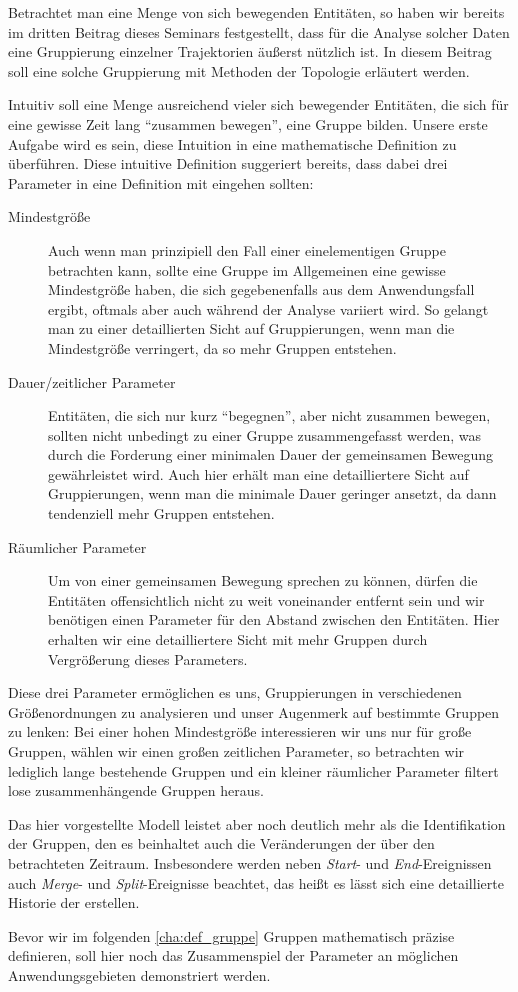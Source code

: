 Betrachtet man eine Menge von sich bewegenden Entitäten, so haben wir bereits im dritten Beitrag dieses Seminars festgestellt, dass für die Analyse solcher Daten eine Gruppierung einzelner Trajektorien äußerst nützlich ist.
In diesem Beitrag soll eine solche Gruppierung mit Methoden der Topologie erläutert werden.

Intuitiv soll eine Menge ausreichend vieler sich bewegender Entitäten, die sich für eine gewisse Zeit lang \enquote{zusammen bewegen}, eine Gruppe bilden.
Unsere erste Aufgabe wird es sein, diese Intuition in eine mathematische Definition zu überführen.
Diese intuitive Definition suggeriert bereits, dass dabei drei Parameter in eine Definition mit eingehen sollten:
\begin{description}
	\item[Mindestgröße] Auch wenn man prinzipiell den Fall einer einelementigen Gruppe betrachten kann, sollte eine Gruppe im Allgemeinen eine gewisse Mindestgröße haben, die sich gegebenenfalls aus dem Anwendungsfall ergibt, oftmals aber auch während der Analyse variiert wird.
	So gelangt man zu einer detaillierten Sicht auf Gruppierungen, wenn man die Mindestgröße verringert, da so mehr Gruppen entstehen.
	\item[Dauer/zeitlicher Parameter] Entitäten, die sich nur kurz \enquote{begegnen}, aber nicht zusammen bewegen, sollten nicht unbedingt zu einer Gruppe zusammengefasst werden, was durch die Forderung einer minimalen Dauer der gemeinsamen Bewegung gewährleistet wird.
	Auch hier erhält man eine detailliertere Sicht auf Gruppierungen, wenn man die minimale Dauer geringer ansetzt, da dann tendenziell mehr Gruppen entstehen.
	\item[Räumlicher Parameter] Um von einer gemeinsamen Bewegung sprechen zu können, dürfen die Entitäten offensichtlich nicht zu weit voneinander entfernt sein und wir benötigen einen Parameter für den Abstand zwischen den Entitäten.
	Hier erhalten wir eine detailliertere Sicht mit mehr Gruppen durch Vergrößerung dieses Parameters.
\end{description}
Diese drei Parameter ermöglichen es uns, Gruppierungen in verschiedenen Größenordnungen zu analysieren und unser Augenmerk auf bestimmte Gruppen zu lenken: Bei einer hohen Mindestgröße interessieren wir uns nur für große Gruppen, wählen wir einen großen zeitlichen Parameter, so betrachten wir lediglich lange bestehende Gruppen und ein kleiner räumlicher Parameter filtert lose zusammenhängende Gruppen heraus.

Das hier vorgestellte Modell leistet aber noch deutlich mehr als die Identifikation der Gruppen, den es beinhaltet auch die Veränderungen der \GrpStruktur über den betrachteten Zeitraum.
Insbesondere werden neben \emph{Start}- und \emph{End}-Ereignissen auch \emph{Merge}- und \emph{Split}-Ereignisse beachtet, das heißt es lässt sich eine detaillierte Historie der \GrpStruktur erstellen.

Bevor wir im folgenden \cref{cha:def_gruppe} Gruppen mathematisch präzise definieren, soll hier noch das Zusammenspiel der Parameter an möglichen Anwendungsgebieten demonstriert werden.
